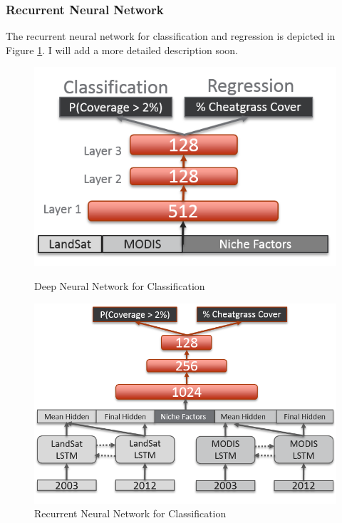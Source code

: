 \def\year{2017}\relax \documentclass[letterpaper]{article}
\begin{document}
\subsubsection{Recurrent Neural Network}
The recurrent neural network for classification and regression is depicted in Figure \ref{fig:rnn}. I will add a more detailed description soon.
\begin{figure}
\centering
\begin{minipage}{.48\textwidth}
  \centering
\includegraphics[width=\textwidth]{pics/dnn.png}
\caption{Deep Neural Network for Classification}\label{fig:dnn}
\end{minipage}
\begin{minipage}{.04\textwidth}
\end{minipage}
\begin{minipage}{.48\textwidth}
  \centering
\includegraphics[width=\textwidth]{pics/rnn.png}
\caption{Recurrent Neural Network for Classification}\label{fig:rnn}
\end{minipage}
\end{figure}
\end{document}
